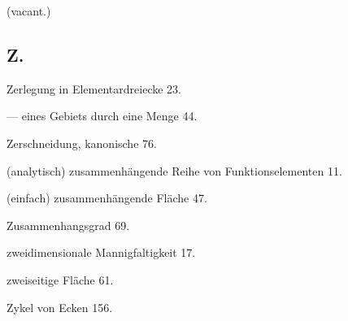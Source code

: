 \documentclass{article}
\begin{document}
(vacant.)

\subsection*{Z.}

Zerlegung in Elementardreiecke 23.

--- eines Gebiets durch eine Menge 44.

Zerschneidung, kanonische 76.

(analytisch) zusammenhängende Reihe von Funktionselementen 11.

(einfach) zusammenhängende Fläche 47.

Zusammenhangsgrad 69.

zweidimensionale Mannigfaltigkeit 17.

zweiseitige Fläche 61.

Zykel von Ecken 156.
\end{document}
